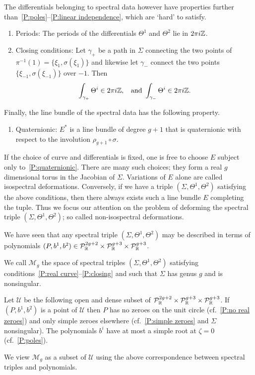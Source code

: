 \documentclass{article}
\begin{document}
The differentials belonging to spectral data however have properties further than~\ref{P:poles}--\ref{P:linear independence}, which are `hard' to satisfy. 
\begin{enumerate}[resume*]
\item\label{P:periods} Periods: The periods of the differentials $\Theta^1$ and $\Theta^2$ lie in $2\pi i\mathbb{Z}$.
\item\label{P:closing} Closing conditions: 
Let $\gamma_+$ be a path in $\Sigma$ connecting the two points of $\pi^{-1}(1) = \{\xi_1, \sigma(\xi_1)\}$ and likewise let $\gamma_-$ connect the two points $\{\xi_{-1}, \sigma(\xi_{-1})\}$ over $-1$. Then
\[
\int_{\gamma_+} \Theta^i \in 2\pi i\mathbb{Z},\;\;\text{ and }
\int_{\gamma_-} \Theta^i \in 2\pi i\mathbb{Z}.
\]
\end{enumerate}
Finally, the line bundle of the spectral data has the following property.
\begin{enumerate}[resume*]
\item\label{P:quaternionic} Quaternionic: $E^*$ is a line bundle of degree $g+1$ that is quaternionic with respect to the involution $\rho_{g+1}\circ \sigma$.
\end{enumerate}

If the choice of curve and differentials is fixed, one is free to choose $E$ subject only to~\ref{P:quaternionic}. There are many such choices; they form a real $g$ dimensional torus in the Jacobian of $\Sigma$. Variations of $E$ alone are called isospectral deformations. Conversely, if we have a triple $(\Sigma,\Theta^1,\Theta^2)$ satisfying the above conditions, then there always exists such a line bundle $E$ completing the tuple. Thus we focus our attention on the problem of deforming the spectral triple $(\Sigma,\Theta^1,\Theta^2)$; so called non-isospectral deformations.

We have seen that any spectral triple $(\Sigma,\Theta^1,\Theta^2)$ may be described in terms of polynomials $(P,b^1,b^2) \in \mathcal{P}^{2g+2}_{\mathbb{R}}\times\mathcal{P}^{g+3}_{\mathbb{R}}\times\mathcal{P}^{g+3}_{\mathbb{R}}$.
\begin{defn}\label{def:M_g}
We call $\mathcal{M}_g$ the space of spectral triples $(\Sigma,\Theta^1,\Theta^2)$ satisfying conditions~\ref{P:real curve}--\ref{P:closing} and such that $\Sigma$ has genus $g$ and is nonsingular. 

Let $\mathcal{U}$ be the following open and dense subset of $\mathcal{P}^{2g+2}_{\mathbb{R}}\times\mathcal{P}^{g+3}_{\mathbb{R}}\times\mathcal{P}^{g+3}_{\mathbb{R}}$. If $(P,b^1,b^2)$ is a point of $\mathcal{U}$ then $P$ has no zeroes on the unit circle (cf.~\ref{P:no real zeroes}) and only simple zeroes elsewhere (cf.~\ref{P:simple zeroes} and $\Sigma$ nonsingular). The polynomials $b^i$ have at most a simple root at $\zeta=0$ (cf.~\ref{P:poles}).

We view $\mathcal{M}_g$ as a subset of $\mathcal{U}$ using the above correspondence between spectral triples and polynomials.
\end{defn}
\end{document}
